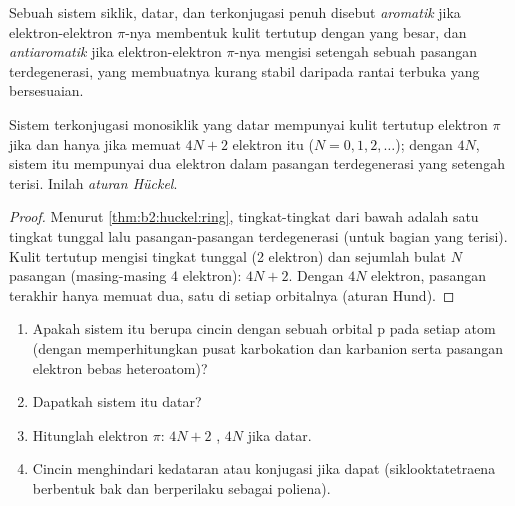 \begin{definition}[Aromatisitas]\label{def:b2:huckel:aromatic}
Sebuah sistem siklik, datar, dan terkonjugasi penuh disebut
\emph{aromatik} jika elektron-elektron $\pi$-nya membentuk
kulit tertutup dengan  yang besar, dan
\emph{antiaromatik} jika elektron-elektron $\pi$-nya
mengisi setengah sebuah pasangan terdegenerasi, yang membuatnya kurang
stabil daripada rantai terbuka yang bersesuaian.
\end{definition}

\begin{theorem}\label{thm:b2:huckel:huckel-rule}
Sistem terkonjugasi monosiklik yang datar mempunyai kulit tertutup
elektron $\pi$ jika dan hanya jika memuat $4N + 2$ elektron itu
($N = 0, 1, 2, \dots$); dengan $4N$, sistem itu mempunyai dua elektron
dalam pasangan terdegenerasi yang setengah terisi. Inilah \emph{aturan
Hückel}.
\end{theorem}

\begin{proof}
Menurut \cref{thm:b2:huckel:ring}, tingkat-tingkat dari bawah adalah satu
tingkat tunggal lalu pasangan-pasangan terdegenerasi (untuk bagian yang
terisi). Kulit tertutup mengisi tingkat tunggal (2 elektron) dan sejumlah
bulat $N$ pasangan (masing-masing 4 elektron): $4N + 2$. Dengan $4N$
elektron, pasangan terakhir hanya memuat dua, satu di setiap orbitalnya
(aturan Hund).
\end{proof}

\begin{method}[Aromatikkah?]\label{met:b2:huckel:aromaticity}
\begin{enumerate}
  \item Apakah sistem itu berupa cincin dengan sebuah orbital p pada setiap
        atom (dengan memperhitungkan pusat karbokation dan karbanion serta
        pasangan elektron bebas heteroatom)?
  \item Dapatkah sistem itu datar?
  \item Hitunglah elektron $\pi$: $4N + 2$ , $4N$  jika
        datar.
  \item Cincin  menghindari kedataran atau konjugasi jika dapat
        (siklooktatetraena berbentuk bak dan berperilaku sebagai poliena).
\end{enumerate}
\end{method}

